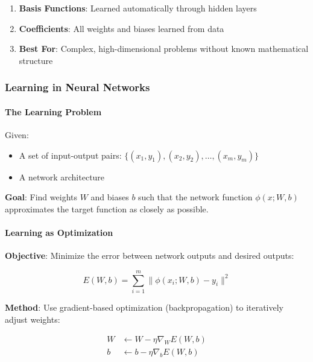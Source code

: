 \begin{enumerate}
\item \textbf{Basis Functions}: Learned automatically through hidden layers
\item \textbf{Coefficients}: All weights and biases learned from data
\item \textbf{Best For}: Complex, high-dimensional problems without known mathematical structure
\end{enumerate}

\subsubsection{Learning in Neural Networks}
\label{subsubsec:learning-nn}

\paragraph{The Learning Problem}
\label{para:learning-problem}

Given:

\begin{itemize}
\item A set of input-output pairs: $\{(x_1, y_1), (x_2, y_2), \ldots, (x_m, y_m)\}$
\item A network architecture
\end{itemize}

\textbf{Goal}: Find weights $W$ and biases $b$ such that the network function $\phi(x; W, b)$ approximates the target function as closely as possible.

\paragraph{Learning as Optimization}
\label{para:learning-optimization}

\textbf{Objective}: Minimize the error between network outputs and desired outputs:

\begin{equation}
\label{eq:learning-objective}
E(W, b) = \sum_{i=1}^{m} \|\phi(x_i; W, b) - y_i\|^2
\end{equation}

\textbf{Method}: Use gradient-based optimization (backpropagation) to iteratively adjust weights:

\begin{align}
\label{eq:weight-update}
W &\leftarrow W - \eta \nabla_W E(W, b) \\
b &\leftarrow b - \eta \nabla_b E(W, b)
\end{align}

